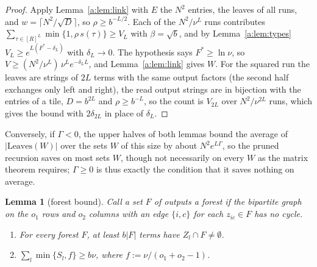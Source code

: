 \documentclass[11pt]{article}
\newtheorem{lemma}[theorem]{Lemma}
\theoremstyle{definition}
\theoremstyle{remark}
\newcommand{\Leaves}{\mathrm{Leaves}}
\begin{document}
\begin{proof}
Apply Lemma~\ref{a:lem:link} with $E$ the $N^2$ entries, the leaves of all runs, and $w=\lceil N^2/\sqrt D\rceil$, so $\rho\ge b^{-L/2}$. Each of the $N^2/\nu^L$ runs contributes $\sum_{\tau\in[R]^L}\min\{1,\rho\,s(\tau)\}\ge V_L$ with $\beta=\sqrt b$, and by Lemma~\ref{a:lem:types} $V_L\ge e^{L(F^*-\delta_L)}$ with $\delta_L\to0$. The hypothesis says $F^*\ge\ln \nu$, so $V\ge(N^2/\nu^L)\,\nu^Le^{-\delta_LL}$, and Lemma~\ref{a:lem:link} gives $W$. For the squared run the leaves are strings of $2L$ terms with the same output factors (the second half exchanges only left and right), the read output strings are in bijection with the entries of a tile, $D=b^{2L}$ and $\rho\ge b^{-L}$, so the count is $V_{2L}$ over $N^2/\nu^{2L}$ runs, which gives the bound with $2\delta_{2L}$ in place of $\delta_L$.
\end{proof}

Conversely, if $\Gamma<0$, the upper halves of both lemmas bound the average of $|\Leaves(W)|$ over the sets $W$ of this size by about $N^2e^{L\Gamma}$, so the pruned recursion saves on most sets $W$, though not necessarily on every $W$ as the matrix theorem requires; $\Gamma\ge0$ is thus exactly the condition that it saves nothing on average.

\begin{lemma}[forest bound]\label{a:lem:forest}
Call a set $F$ of outputs a \emph{forest} if the bipartite graph on the $o_1$ rows and $o_2$ columns with an edge $\{i,c\}$ for each $z_{ic}\in F$ has no cycle.
\begin{enumerate}[label=(\alph*),nosep]
\item For every forest $F$, at least $b|F|$ terms have $Z_l\cap F\ne\emptyset$.
\item $\sum_l\min\{S_l,f\}\ge b\nu$, where $f:=\nu/(o_1+o_2-1)$.
\end{enumerate}
\end{lemma}
\end{document}
